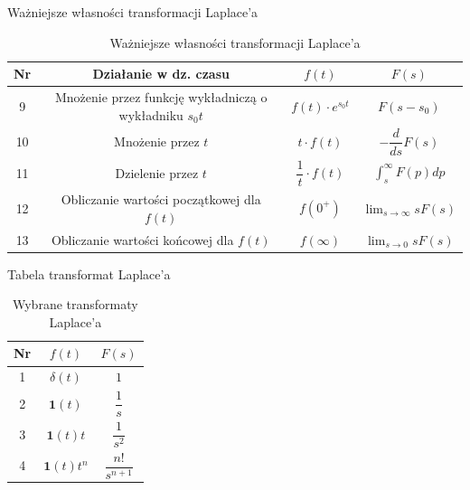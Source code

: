 \begin{frame}{Ważniejsze własności transformacji Laplace'a}
	\begin{table}
		\centering
		\caption{Ważniejsze własności transformacji Laplace'a}
		\begin{tabular}{|c|c|c|c|}
			\hline
			Nr & Działanie w dz. czasu                                   & $f(t)$                    & $F(s)$                                   \\[1ex]
			\hline
			9  & Mnożenie przez funkcję wykładniczą o wykładniku $s_0 t$ & $f(t) \cdot e^{s_0 t}$    & $F(s-s_0)$                               \\[1ex]
			\hline
			10 & Mnożenie przez $t$                                      & $t \cdot f(t)$            & $- \dfrac{d}{ds} F(s)$                   \\[1ex]
			\hline
			11 & Dzielenie przez $t$                                     & $\dfrac{1}{t} \cdot f(t)$ & $\displaystyle \int_s^\infty F(p) dp$    \\[1ex]
			\hline
			12 & Obliczanie wartości początkowej dla $f(t)$              & $f(0^{+})$                & $\displaystyle \lim_{s\to\infty} s F(s)$ \\[1ex]
			\hline
			13 & Obliczanie wartości końcowej dla $f(t)$                 & $f(\infty)$               & $\displaystyle \lim_{s \to 0} s F(s)$    \\[1ex]
			\hline
		\end{tabular}
	\end{table}
\end{frame}

\begin{frame}{Tabela transformat Laplace'a}
	\begin{table}
		\centering
		\caption{Wybrane transformaty Laplace'a}
		\begin{tabular}{|c|c|c|}
			\hline
			Nr & $f(t)$              & $F(s)$                \\[1ex]
			\hline
			1  & $\delta (t)$        & $1$                   \\[1ex]
			\hline
			2  & $\mathbf{1}(t)$     & $\dfrac{1}{s}$        \\[1ex]
			\hline
			3  & $\mathbf{1}(t) t$   & $\dfrac{1}{s^2}$      \\[1ex]
			\hline
			4  & $\mathbf{1}(t) t^n$ & $\dfrac{n!}{s^{n+1}}$ \\[1ex]
			\hline
		\end{tabular}
	\end{table}
\end{frame}

